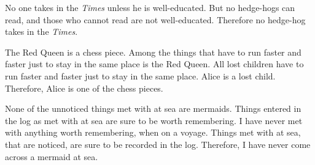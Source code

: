 \begin{exercises}
\item \label{itm:hedgehogs} No one takes in the \textit{Times} unless he is well-educated. But no hedge-hogs can read, and those who cannot read are not well-educated. Therefore no hedge-hog takes in the \textit{Times}.

\item The Red Queen is a chess piece. Among the things that have to run faster and faster just to stay in the same place is the Red Queen. All lost children have to run faster and faster just to stay in the same place. Alice is a lost child. Therefore, Alice is one of the chess pieces. 


\item \label{itm:mermaids} None of the unnoticed things met with at sea are mermaids. Things entered in the log as met with at sea are sure to be worth remembering. I have never met with anything worth remembering, when on a voyage. Things met with at sea, that are noticed, are sure to be recorded in the log. Therefore, I have never come across a mermaid at sea. %







\end{exercises}
